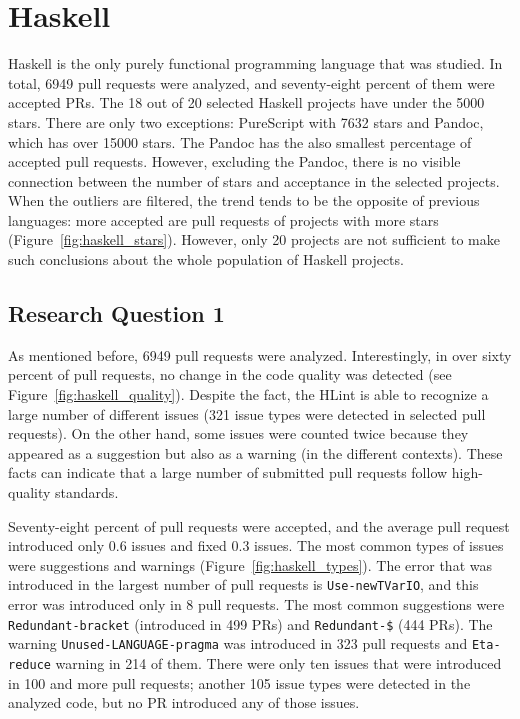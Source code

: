 \documentclass[digital,oneside,oldtable,nolof,nolot,nocover]{fithesis4}
\begin{document}
\section{Haskell}
\label{sec:org3ddd30b}
Haskell is the only purely functional programming language that was studied.
In total, 6949 pull requests were analyzed, and seventy-eight percent of them were accepted PRs.
The 18 out of 20 selected Haskell projects have under the 5000 stars. There
are only two exceptions: PureScript with 7632 stars and Pandoc, which has over
15000 stars. The Pandoc has the also smallest percentage of accepted pull
requests.  However, excluding the Pandoc, there is no visible connection
between the number of stars and acceptance in the selected projects. When the
outliers are filtered, the trend tends to be the opposite of previous languages:
more accepted are pull requests of projects with more stars (Figure~\ref{fig:haskell_stars}).
However, only 20 projects are not sufficient to make such conclusions about the whole
population of Haskell projects.
\subsection{Research Question 1}
\label{sec:orgbfcf568}
As mentioned before, 6949 pull requests were analyzed. Interestingly, in over sixty
percent of pull requests, no change in the code quality was detected (see Figure~\ref{fig:haskell_quality}).
Despite the fact, the HLint is able to recognize a large number of different issues (321 issue
types were detected in selected pull requests). On the other hand, some issues
were counted twice because they appeared as a suggestion but also as a warning (in the different contexts).
These facts can indicate that a large
number of submitted pull requests follow high-quality standards.

Seventy-eight percent of pull requests were accepted, and the average pull request introduced
only 0.6 issues and fixed 0.3 issues. The most common types of issues were suggestions
and warnings (Figure~\ref{fig:haskell_types}). The error that was
introduced in the largest number of pull requests is
\texttt{Use-newTVarIO}, and this error was introduced only in 8 pull requests. The most common
suggestions were \texttt{Redundant-bracket} (introduced in 499 PRs) and \texttt{Redundant-\$} (444 PRs).
The warning \texttt{Unused-LANGUAGE-pragma} was introduced in 323 pull requests and \texttt{Eta-reduce}
warning in 214 of them. There were only ten issues that were introduced in 100 and more
pull requests; another 105 issue types were detected in the analyzed code, but no PR introduced
any of those issues.
\end{document}
